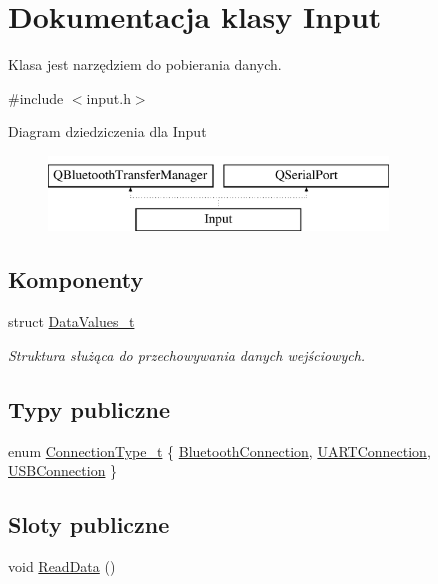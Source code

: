 \hypertarget{class_input}{}\section{Dokumentacja klasy Input}
\label{class_input}


Klasa jest narzędziem do pobierania danych.  




{\ttfamily \#include $<$input.\+h$>$}

Diagram dziedziczenia dla Input\begin{figure}[H]
\begin{center}
\leavevmode
\includegraphics[height=2.000000cm]{class_input}
\end{center}
\end{figure}
\subsection*{Komponenty}
\begin{DoxyCompactItemize}
\item 
struct \hyperlink{struct_input_1_1_data_values__t}{Data\+Values\+\_\+t}
\begin{DoxyCompactList}\small\item\em Struktura służąca do przechowywania danych wejściowych. \end{DoxyCompactList}\end{DoxyCompactItemize}
\subsection*{Typy publiczne}
\begin{DoxyCompactItemize}
\item 
enum \hyperlink{class_input_a3be20be9b454515798ecd3370f4e36fd}{Connection\+Type\+\_\+t} \{ \hyperlink{class_input_a3be20be9b454515798ecd3370f4e36fda6046a4f4c91eb7a02b26c594c36b9374}{Bluetooth\+Connection}, 
\hyperlink{class_input_a3be20be9b454515798ecd3370f4e36fdad2b7655a556514e7611474e4aafb75b8}{U\+A\+R\+T\+Connection}, 
\hyperlink{class_input_a3be20be9b454515798ecd3370f4e36fdaf2a909e54a7c789666bc3bebb2a67370}{U\+S\+B\+Connection}
 \}
\end{DoxyCompactItemize}
\subsection*{Sloty publiczne}
\begin{DoxyCompactItemize}
\item 
void \hyperlink{class_input_a7da95e48dbde1c10a727545166dac288}{Read\+Data} ()
\end{DoxyCompactItemize}
